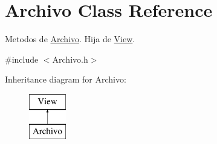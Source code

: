 \hypertarget{class_archivo}{}\section{Archivo Class Reference}
\label{class_archivo}


Metodos de \hyperlink{class_archivo}{Archivo}. Hija de \hyperlink{class_view}{View}.  




{\ttfamily \#include $<$Archivo.\+h$>$}

Inheritance diagram for Archivo\+:\begin{figure}[H]
\begin{center}
\leavevmode
\includegraphics[height=2.000000cm]{class_archivo}
\end{center}
\end{figure}
